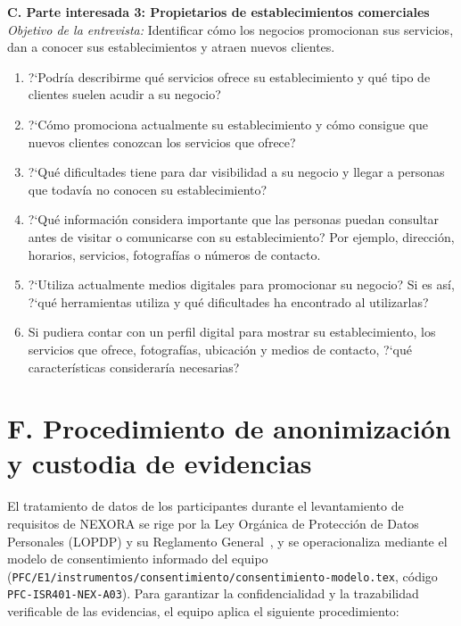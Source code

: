 \documentclass[11pt,a4paper]{article}
\begin{document}
\vspace{3pt}
\noindent\textbf{C. Parte interesada 3: Propietarios de establecimientos comerciales}\\
\textit{Objetivo de la entrevista:} Identificar c\'omo los negocios promocionan sus servicios, dan a conocer sus establecimientos y atraen nuevos clientes.
\begin{enumerate}[label=\textbf{\arabic*.}, leftmargin=1.8em, itemsep=1pt, topsep=2pt, start=15]
    \item ?`Podr\'ia describirme qu\'e servicios ofrece su establecimiento y qu\'e tipo de clientes suelen acudir a su negocio?
    \item ?`C\'omo promociona actualmente su establecimiento y c\'omo consigue que nuevos clientes conozcan los servicios que ofrece?
    \item ?`Qu\'e dificultades tiene para dar visibilidad a su negocio y llegar a personas que todav\'ia no conocen su establecimiento?
    \item ?`Qu\'e informaci\'on considera importante que las personas puedan consultar antes de visitar o comunicarse con su establecimiento? Por ejemplo, direcci\'on, horarios, servicios, fotograf\'ias o n\'umeros de contacto.
    \item ?`Utiliza actualmente medios digitales para promocionar su negocio? Si es as\'i, ?`qu\'e herramientas utiliza y qu\'e dificultades ha encontrado al utilizarlas?
    \item Si pudiera contar con un perfil digital para mostrar su establecimiento, los servicios que ofrece, fotograf\'ias, ubicaci\'on y medios de contacto, ?`qu\'e caracter\'isticas considerar\'ia necesarias?
\end{enumerate}

\section*{F. Procedimiento de anonimizaci\'on y custodia de evidencias}

El tratamiento de datos de los participantes durante el levantamiento de requisitos de NEXORA se rige por la Ley Org\'anica de Protecci\'on de Datos Personales (LOPDP) y su Reglamento General~\cite{lopdp2021, reglamento2023}, y se operacionaliza mediante el modelo de consentimiento informado del equipo (\texttt{PFC/E1/\allowbreak instrumentos/\allowbreak consentimiento/\allowbreak consentimiento-modelo.tex}, c\'odigo \texttt{PFC-ISR401-NEX-A03}). Para garantizar la confidencialidad y la trazabilidad verificable de las evidencias, el equipo aplica el siguiente procedimiento:
\end{document}
